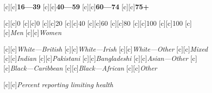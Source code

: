 \documentclass[11 pt, a4paper]{report}
\begin{document}
\begin{figure}[hbtp!]
[c][c]{\small{\textbf{16---39}}}
[c][c]{\small{\textbf{40---59}}}
[c][c]{\small{\textbf{60---74}}}
[c][c]{\small{\textbf{75+}}}

[c][c]{\small{0}}
[c][c]{\small{0}}
[c][c]{\small{20}}
[c][c]{\small{40}}
[c][c]{\small{60}}
[c][c]{\small{80}}
[c][c]{\small{100}}
[c][c]{\small{100}}
[c][c]{\small{\emph{Men}}}
[c][c]{\small{\emph{Women}}}

[c][c]{\scriptsize{\emph{White---British}}}
[c][c]{\scriptsize{\emph{White---Irish}}}
[c][c]{\scriptsize{\emph{White---Other}}}
[c][c]{\scriptsize{\emph{Mixed}}}
[c][c]{\scriptsize{\emph{Indian}}}
[c][c]{\scriptsize{\emph{Pakistani}}}
[c][c]{\scriptsize{\emph{Bangladeshi}}}
[c][c]{\scriptsize{\emph{Asian---Other}}}
[c][c]{\scriptsize{\emph{Black---Caribbean}}}
[c][c]{\scriptsize{\emph{Black---African}}}
[c][c]{\scriptsize{\emph{Other}}}

[c][c]{\scriptsize{\emph{Percent reporting limiting health}}}


\end{figure}
\end{document}
